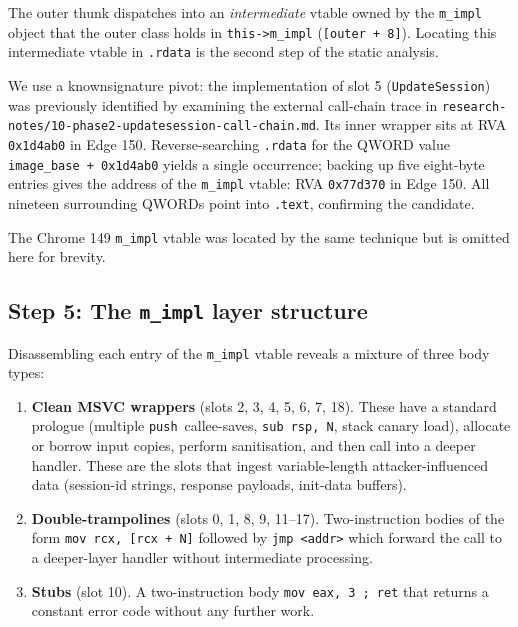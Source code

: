 \documentclass[11pt,letterpaper]{article}
\begin{document}
The outer thunk dispatches into an \emph{intermediate} vtable owned by
the \texttt{m\_impl} object that the outer class holds in
\texttt{this->m\_impl} (\texttt{[outer + 8]}).  Locating this
intermediate vtable in \texttt{.rdata} is the second step of the
static analysis.

We use a knownsignature pivot: the implementation of slot 5
(\texttt{UpdateSession}) was previously identified by examining the
external call-chain trace in
\texttt{research-notes/10-phase2-updatesession-call-chain.md}.  Its
inner wrapper sits at RVA \texttt{0x1d4ab0} in Edge 150.  Reverse-searching
\texttt{.rdata} for the QWORD value \texttt{image\_base + 0x1d4ab0}
yields a single occurrence; backing up five eight-byte entries gives
the address of the \texttt{m\_impl} vtable: RVA \texttt{0x77d370} in
Edge 150.  All nineteen surrounding QWORDs point into \texttt{.text},
confirming the candidate.

The Chrome 149 \texttt{m\_impl} vtable was located by the same
technique but is omitted here for brevity.

\subsection{Step 5: The \texttt{m\_impl} layer structure}
\label{sec:static-layer2}

Disassembling each entry of the \texttt{m\_impl} vtable reveals a
mixture of three body types:

\begin{enumerate}[itemsep=2pt,topsep=2pt]
  \item \textbf{Clean MSVC wrappers} (slots 2, 3, 4, 5, 6, 7, 18).
        These have a standard prologue (multiple
        \texttt{push}~callee-saves, \texttt{sub rsp, N}, stack canary
        load), allocate or borrow input copies, perform sanitisation,
        and then call into a deeper handler.  These are the slots
        that ingest variable-length attacker-influenced data
        (session-id strings, response payloads, init-data buffers).
  \item \textbf{Double-trampolines} (slots 0, 1, 8, 9, 11--17).
        Two-instruction bodies of the form
        \texttt{mov rcx, [rcx + N]} followed by \texttt{jmp <addr>}
        which forward the call to a deeper-layer handler without
        intermediate processing.
  \item \textbf{Stubs} (slot 10).  A two-instruction body
        \texttt{mov eax, 3 ; ret} that returns a constant error code
        without any further work.
\end{enumerate}
\end{document}
